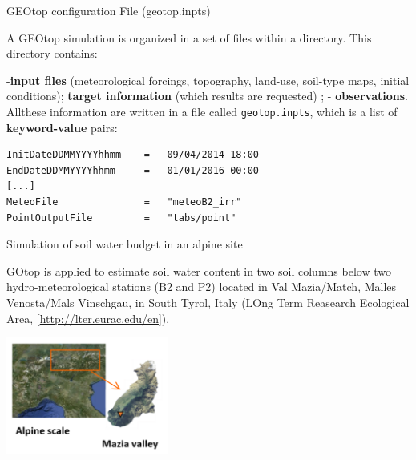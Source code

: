 \documentclass[ignorenonframetext,]{beamer}
\begin{document}
\begin{frame}[fragile]{GEOtop configuration File (geotop.inpts)}

A GEOtop simulation is organized in a set of files within a directory.
This directory contains:

-\textbf{input files} (meteorological forcings, topography, land-use,
soil-type maps, initial conditions); \textbf{target information} (which
results are requested) ; - \textbf{observations}. Allthese information
are written in a file called \texttt{geotop.inpts}, which is a list of
\textbf{keyword-value} pairs:

\begin{verbatim}
InitDateDDMMYYYYhhmm    =   09/04/2014 18:00  
EndDateDDMMYYYYhhmm     =   01/01/2016 00:00 
[...] 
MeteoFile               =   "meteoB2_irr" 
PointOutputFile         =   "tabs/point" 
\end{verbatim}

\end{frame}

\begin{frame}{Simulation of soil water budget in an alpine site}

GOtop is applied to estimate soil water content in two soil columns
below two hydro-meteorological stations (B2 and P2) located in Val
Mazia/Match, Malles Venosta/Mals Vinschgau, in South Tyrol, Italy (LOng
Term Reasearch Ecological Area, {[}\url{http://lter.eurac.edu/en}{]}).

\includegraphics[width=0.40000\textwidth]{resources/images/mazia_2.png}

\end{frame}
\end{document}
